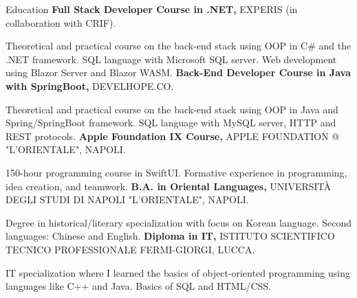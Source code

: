 \begin{rubric}{Education}
%
	\textbf{Full Stack Developer Course in .NET,} EXPERIS (in collaboration with CRIF).
	\par Theoretical and practical course on the back-end stack using OOP in C\# and the .NET framework. SQL language with Microsoft SQL server. Web development using Blazor Server and Blazor WASM.
%
%
	\textbf{Back-End Developer Course in Java with SpringBoot,} DEVELHOPE.CO.
	\par Theoretical and practical course on the back-end stack using OOP in Java and Spring/SpringBoot framework. SQL language with MySQL server, HTTP and REST protocols.
%
%
	\textbf{Apple Foundation IX Course,} APPLE FOUNDATION @ "L'ORIENTALE", NAPOLI.
	\par 150-hour programming course in SwiftUI. Formative experience in programming, idea creation, and teamwork.
%
%
	\textbf{B.A. in Oriental Languages,} UNIVERSITÀ DEGLI STUDI DI NAPOLI "L'ORIENTALE", NAPOLI.
	\par Degree in historical/literary specialization with focus on Korean language. Second languages: Chinese and English.
%
%
	\textbf{Diploma in IT,} ISTITUTO SCIENTIFICO TECNICO PROFESSIONALE FERMI-GIORGI, LUCCA.
	\par IT specialization where I learned the basics of object-oriented programming using languages like C++ and Java. Basics of SQL and HTML/CSS.
%
\end{rubric}